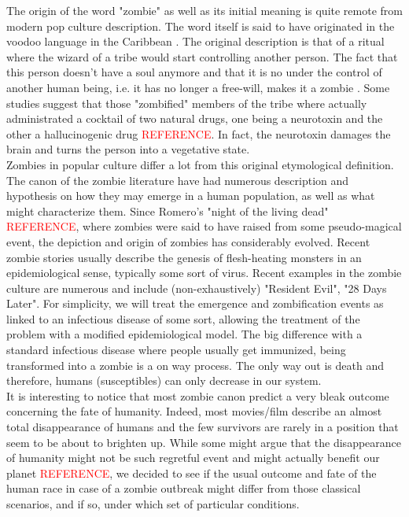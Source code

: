 \documentclass[11pt]{article}
\begin{document}
The origin of the word "zombie" as well as its initial meaning is quite remote from modern pop culture description. The word itself is said to have originated in the voodoo language in the Caribbean \cite{drezner}. The original description is that of a ritual where the wizard of a tribe would start controlling another person. The fact that this person doesn't have a soul anymore and that it is no under the control of another human being, i.e. it has no longer a free-will, makes it a zombie \cite{drezner}. Some studies suggest that those "zombified" members of the tribe where actually administrated a cocktail of two natural drugs, one being a neurotoxin and the other a hallucinogenic drug \textcolor{red}{REFERENCE}. In fact, the neurotoxin damages the brain and turns the person into a vegetative state.\\

Zombies in popular culture differ a lot from this original etymological definition. The canon of the zombie literature have had numerous description and hypothesis on how they may emerge in a human population, as well as what might characterize them. Since Romero's "night of the living dead" \textcolor{red}{REFERENCE}, where zombies were said to have raised from some pseudo-magical event, the depiction and origin of zombies has considerably evolved. Recent zombie stories usually describe the genesis of flesh-heating monsters in an epidemiological sense, typically some sort of virus. Recent examples in the zombie culture are numerous and include (non-exhaustively) "Resident Evil", "28 Days Later". For simplicity, we will treat the emergence and zombification events as linked to an infectious disease of some sort, allowing the treatment of the problem with a modified epidemiological model. The big difference with a standard infectious disease where people usually get immunized, being transformed into a zombie is a on way process. The only way out is death and therefore, humans (susceptibles) can only decrease in our system.\\

It is interesting to notice that most zombie canon predict a very bleak outcome concerning the fate of humanity. Indeed, most movies/film describe an almost total disappearance of humans and the few survivors are rarely in a position that seem to be about to brighten up. While some might argue that the disappearance of humanity might not be such regretful event and might actually benefit our planet \textcolor{red}{REFERENCE}, we decided to see if the usual outcome and fate of the human race in case of a zombie outbreak might differ from those classical scenarios, and if so, under which set of particular conditions. 
\end{document}
